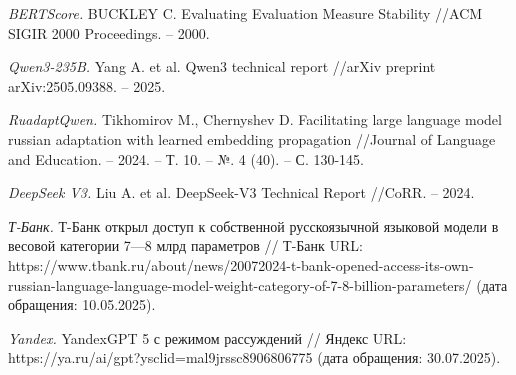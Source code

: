 \documentclass{article}
\begin{document}
\begin{thebibliography}{99}
\textit{BERTScore.}
BUCKLEY C. Evaluating Evaluation Measure Stability //ACM SIGIR 2000 Proceedings. – 2000.

\textit{Qwen3-235B.}
Yang A. et al. Qwen3 technical report //arXiv preprint arXiv:2505.09388. – 2025.

\textit{RuadaptQwen.}
Tikhomirov M., Chernyshev D. Facilitating large language model russian adaptation with learned embedding propagation //Journal of Language and Education. – 2024. – Т. 10. – №. 4 (40). – С. 130-145.

\textit{DeepSeek V3.}
Liu A. et al. DeepSeek-V3 Technical Report //CoRR. – 2024.

\textit{Т-Банк.}
Т-Банк открыл доступ к собственной русскоязычной языковой модели в весовой категории 7—8 млрд параметров 
// Т-Банк URL: https://www.tbank.ru/about/news/20072024-t-bank-opened-access-its-own-russian-language-language-model-weight-category-of-7-8-billion-parameters/ (дата обращения: 10.05.2025).

\textit{Yandex.}
YandexGPT 5 с режимом рассуждений // Яндекс URL: https://ya.ru/ai/gpt?ysclid=mal9jrssc8906806775 (дата обращения: 30.07.2025).
\end{thebibliography}
\end{document}
